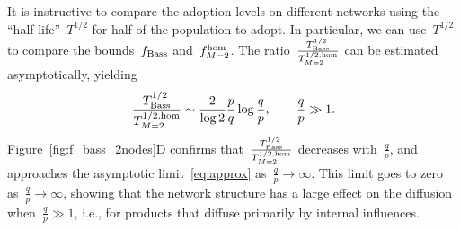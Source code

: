 \documentclass[review]{elsarticle}
\begin{document}
It is  instructive to compare the adoption levels on different networks using the ``half-life''~$T^{1/2}$ for half of the population to adopt.
In particular, we can use~$T^{1/2}$ to compare the bounds~$f_{\rm Bass}$ and~$f_{M=2}^{\rm hom}$.
 The ratio~$\frac{T_{\rm Bass}^{1/2}}{T^{1/2, {\rm hom}}_{M=2}}$ can be estimated asymptotically, yielding
 \begin{equation}
 \label{eq:approx}
 \frac{T_{\rm Bass}^{1/2}}{T^{1/2, {\rm hom}}_{M=2}}\sim \frac{2}{\log 2 }\frac{p}{q}\log \frac{q}{p}, \qquad  \frac{q}{p} \gg 1.
 \end{equation}
 Figure~\ref{fig:f_bass_2nodes}D confirms that~$\frac{T^{1/2}_{\rm Bass}}{T^{1/2, {\rm hom}}_{M=2}}$ decreases with~$\frac{q}{p}$, and approaches the asymptotic limit~\eqref{eq:approx} as~$\frac{q}{p}\rightarrow \infty$.
This limit goes to zero as~$\frac{q}{p}\rightarrow \infty$, showing that the network structure has a large effect on the diffusion when~$\frac{q}{p}\gg 1$, i.e., for products that  diffuse primarily by internal influences.
\end{document}
